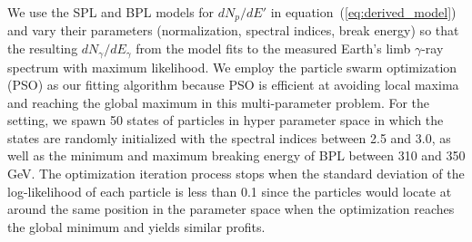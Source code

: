 We use the SPL and BPL models for $dN_p/dE'$ in equation~(\ref{eq:derived_model}) and vary their parameters
(normalization, spectral indices, break energy) so that the resulting $dN_\gamma/dE_\gamma$
from the model fits to the measured Earth's limb $\gamma$-ray spectrum with maximum
likelihood. We employ the particle swarm optimization (PSO) \cite{pso_optimize} as our fitting algorithm
because PSO is efficient at avoiding local maxima and reaching the global maximum in
this multi-parameter problem.
For the setting, we spawn 50 states of particles in hyper parameter space
in which the states are randomly initialized with the spectral indices
between 2.5 and 3.0, as well as the minimum and maximum breaking energy of BPL
between 310 and 350 GeV. The optimization iteration process stops when the
standard deviation of the log-likelihood of each particle is less than 0.1
since the particles would locate at around the same position in the parameter
space when the optimization reaches the global minimum and yields similar profits.




